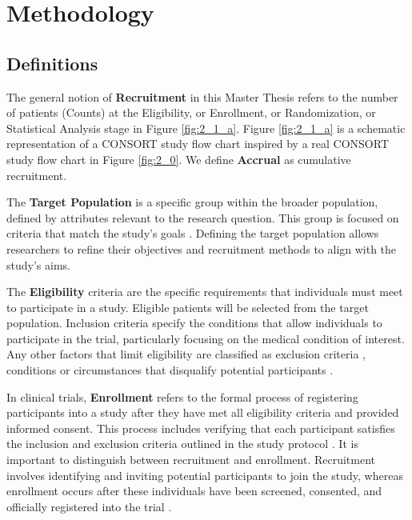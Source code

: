 








\chapter{Methodology} 

\section{Definitions}

The general notion of \textbf{Recruitment} in this Master Thesis refers to the number of patients (Counts) at the Eligibility, or Enrollment, or Randomization, or Statistical Analysis stage in Figure \ref{fig:2_1_a}. Figure \ref{fig:2_1_a} is a schematic representation of a CONSORT study flow chart \citep{schulz2010consort} inspired by a real CONSORT study flow chart in Figure \ref{fig:2_0}. We define \textbf{Accrual} as cumulative recruitment.

The \textbf{Target Population} is a specific group within the broader population, defined by attributes relevant to the research question. This group is focused on criteria that match the study's goals \citep{willie2024population}. Defining the target population allows researchers to refine their objectives and recruitment methods to align with the study's aims.


The \textbf{Eligibility} criteria are the specific requirements that individuals must meet to participate in a study. Eligible patients will be selected from the target population. Inclusion criteria specify the conditions that allow individuals to participate in the trial, particularly focusing on the medical condition of interest. Any other factors that limit eligibility are classified as exclusion criteria \citep{van2007eligibility}, conditions or circumstances that disqualify potential participants \citep{food2018evaluating}.


In clinical trials, \textbf{Enrollment} refers to the formal process of registering participants into a study after they have met all eligibility criteria and provided informed consent. This process includes verifying that each participant satisfies the inclusion and exclusion criteria outlined in the study protocol \citep{NIH2021}. It is important to distinguish between recruitment and enrollment. Recruitment involves identifying and inviting potential participants to join the study, whereas enrollment occurs after these individuals have been screened, consented, and officially registered into the trial \citep{frank2004current}. 

